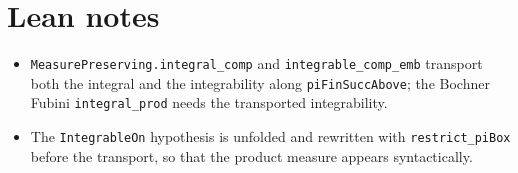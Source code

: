 \documentclass[11pt]{article}
\begin{document}
\section{Lean notes}
\begin{itemize}
\item \texttt{MeasurePreserving.integral\_comp} and \texttt{integrable\_comp\_emb} transport both the
integral and the integrability along \texttt{piFinSuccAbove}; the Bochner Fubini
\texttt{integral\_prod} needs the transported integrability.
\item The \texttt{IntegrableOn} hypothesis is unfolded and rewritten with \texttt{restrict\_piBox}
before the transport, so that the product measure appears syntactically.
\end{itemize}
\end{document}
